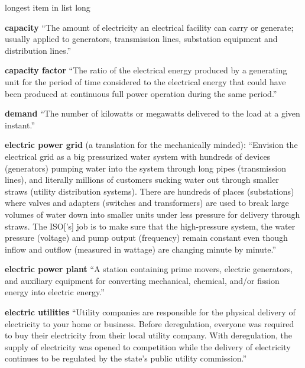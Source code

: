 \documentclass[10pt]{article}
\begin{document}
\begin{labeling}{longest item in list long}

\item [\textbf{capacity}] ``The amount of electricity an electrical facility can carry or generate; usually applied to generators, transmission lines, substation equipment and distribution lines.'' \cite{understandingelectricity}
\item [\textbf{capacity factor}] ``The ratio of the electrical energy produced by a generating unit for the period of time considered to the electrical energy that could have been produced at continuous full power operation during the same period.'' \cite{EIAglossary}

\item [\textbf{demand}] ``The number of kilowatts or megawatts delivered to the load at a given instant.'' \cite{understandingelectricity}

\item [\textbf{electric power grid}] (a translation for the mechanically minded): ``Envision the electrical grid as a big pressurized water system with hundreds of devices (generators) pumping water into the system through long pipes (transmission lines), and literally millions of customers sucking water out through smaller straws (utility distribution systems). There are hundreds of places (substations) where valves and adapters (switches and transformers) are used to break large volumes of water down into smaller units under less pressure for delivery through straws. The ISO['s] job is to make sure that the high-pressure system, the water pressure (voltage) and pump output (frequency) remain constant even though inflow and outflow (measured in wattage) are changing minute by minute.'' \cite{understandingelectricity}

\item [\textbf{electric power plant}]  ``A station containing prime movers, electric generators, and auxiliary equipment for converting mechanical, chemical, and/or fission energy into electric energy.'' \cite{EIAglossary}

\item [\textbf{electric utilities}]  ``Utility companies are responsible for the physical delivery of electricity to your home or business. Before deregulation, everyone was required to buy their electricity from their local utility company.  With deregulation, the supply of electricity was opened to competition while the delivery of electricity continues to be regulated by the state's public utility commission.'' \cite{noauthor_2017-mo}



\end{labeling}
\end{document}
